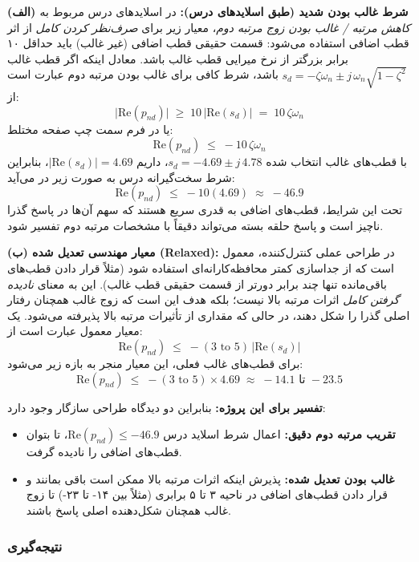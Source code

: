 \documentclass[a4paper]{article}
\begin{document}
\medskip
\noindent \textbf{(الف) شرط غالب بودن شدید (طبق اسلایدهای درس):}
در اسلایدهای درس مربوط به \textit{کاهش مرتبه / غالب بودن زوج مرتبه دوم}، معیار زیر برای \textit{صرف‌نظر کردن کامل} از اثر قطب اضافی استفاده می‌شود: قسمت حقیقی قطب اضافی (غیر غالب) باید حداقل ۱۰ برابر بزرگتر از نرخ میرایی قطب غالب باشد. معادل اینکه اگر قطب غالب $s_d=-\zeta\omega_n \pm j\,\omega_n\sqrt{1-\zeta^2}$ باشد، شرط کافی برای غالب بودن مرتبه دوم عبارت است از:
\[
\bigl|\mathrm{Re}(p_{nd})\bigr| \;\ge\; 10\,\bigl|\mathrm{Re}(s_d)\bigr| \;=\; 10\,\zeta\omega_n
\]
یا در فرم سمت چپ صفحه مختلط:
\[
\mathrm{Re}(p_{nd}) \;\le\; -10\,\zeta\omega_n
\]
با قطب‌های غالب انتخاب شده $s_d=-4.69\pm j\,4.78$، داریم $|\mathrm{Re}(s_d)|=4.69$، بنابراین شرط سخت‌گیرانه درس به صورت زیر در می‌آید:
\[
\mathrm{Re}(p_{nd}) \;\le\; -10(4.69)\;\approx\;-46.9
\]
تحت این شرایط، قطب‌های اضافی به قدری سریع هستند که سهم آن‌ها در پاسخ گذرا ناچیز است و پاسخ حلقه بسته می‌تواند دقیقاً با مشخصات مرتبه دوم تفسیر شود.

\medskip
\noindent \textbf{(ب) معیار مهندسی تعدیل شده (Relaxed):}
در طراحی عملی کنترل‌کننده، معمول است که از جداسازی کمتر محافظه‌کارانه‌ای استفاده شود (مثلاً قرار دادن قطب‌های باقی‌مانده تنها چند برابر دورتر از قسمت حقیقی قطب غالب). این به معنای \textit{نادیده گرفتن کامل} اثرات مرتبه بالا نیست؛ بلکه هدف این است که زوج غالب همچنان رفتار اصلی گذرا را شکل دهند، در حالی که مقداری از تأثیرات مرتبه بالا پذیرفته می‌شود. یک معیار معمول عبارت است از:
\[
\mathrm{Re}(p_{nd}) \;\le\; -(3\text{ to }5)\,\bigl|\mathrm{Re}(s_d)\bigr|
\]
برای قطب‌های غالب فعلی، این معیار منجر به بازه زیر می‌شود:
\[
\mathrm{Re}(p_{nd}) \;\le\; -(3\text{ to }5)\times 4.69 \;\approx\; -14.1 \text{ تا } -23.5
\]

\medskip
\noindent \textbf{تفسیر برای این پروژه:}
بنابراین دو دیدگاه طراحی سازگار وجود دارد:
\begin{itemize}
	\item \textbf{تقریب مرتبه دوم دقیق:} اعمال شرط اسلاید درس $\mathrm{Re}(p_{nd}) \le -46.9$، تا بتوان قطب‌های اضافی را نادیده گرفت.
	\item \textbf{غالب بودن تعدیل شده:} پذیرش اینکه اثرات مرتبه بالا ممکن است باقی بمانند و قرار دادن قطب‌های اضافی در ناحیه ۳ تا ۵ برابری (مثلاً بین ۱۴- تا ۲۳-) تا زوج غالب همچنان شکل‌دهنده اصلی پاسخ باشند.
\end{itemize}


\subsubsection*{نتیجه‌گیری}
\end{document}
